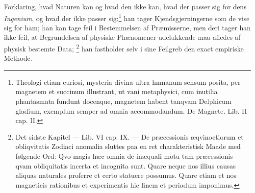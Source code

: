 \documentclass[12pt,a4paper]{book}
\renewcommand{\thefootnote}{*)}
\begin{document}
Forklaring, hvad Naturen kan og hvad den ikke kan, hvad der passer sig
for dens \emph{Ingenium}, og hvad der ikke passer
sig:\footnote{%
Theologi etiam curiosi, mysteria divina ultra hnmanum sensum posita,
per magnetem et succinum illustrant, ut vani metaphysici, cum inutilia
phantasmata fundunt docenque, magnetem habent tanqvam Delphicum
gladium, exemplum semper ad omnia accommodandum. De Magnete. Lib. II
cap. II.} han tager Kjendsgjerningerne som de vise sig for ham; han kan
tage feil i Bestemmelsen af Præmisserne, men deri tager han ikke feil,
at Begrundelsen af physiske Phænomener udelukkende maa afledes af
physisk bestemte Data;%
\renewcommand{\thefootnote}{**)}%
\footnote{%
Det sidste Kapitel --- Lib. VI cap. IX. --- De præcessionis
æqvinoctiorum et obliqvitatis Zodiaci anomalia sluttes paa en ret
charakteristisk Maade med følgende Ord: Qvo magis hæc omnia de inæquali
motu tam præcessionis qvam obliquitatis incerta et incognita sunt.
Quare neque nos illius causas aliquas naturales proferre et certo
statuere possumus. Quare etiam et nos magneticis rationibus et
experimentis hic finem et periodum imponimus.}%
\renewcommand{\thefootnote}{*)}
han fastholder selv i sine Feilgreb den exact empiriske Methode.
\end{document}
